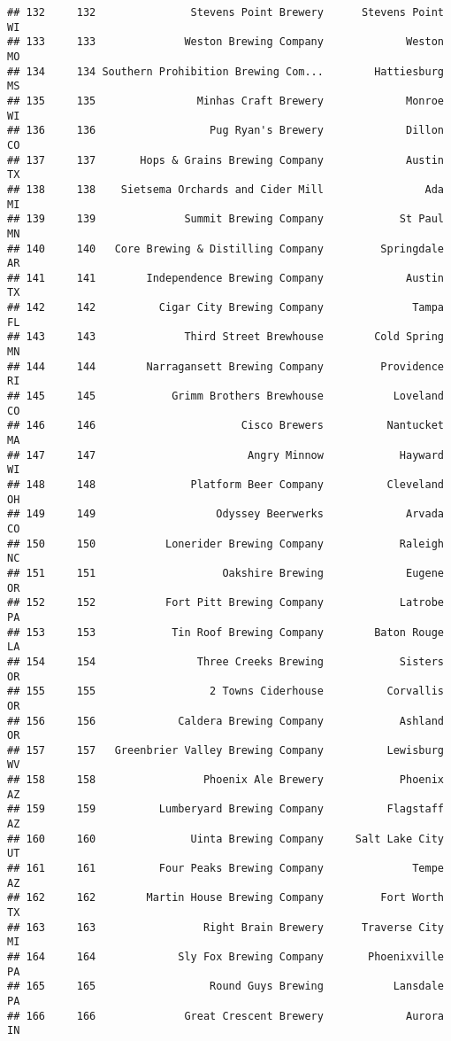 \documentclass[
]{article}
\begin{document}
\begin{verbatim}
## 132     132               Stevens Point Brewery      Stevens Point    WI
## 133     133              Weston Brewing Company             Weston    MO
## 134     134 Southern Prohibition Brewing Com...        Hattiesburg    MS
## 135     135                Minhas Craft Brewery             Monroe    WI
## 136     136                  Pug Ryan's Brewery             Dillon    CO
## 137     137       Hops & Grains Brewing Company             Austin    TX
## 138     138    Sietsema Orchards and Cider Mill                Ada    MI
## 139     139              Summit Brewing Company            St Paul    MN
## 140     140   Core Brewing & Distilling Company         Springdale    AR
## 141     141        Independence Brewing Company             Austin    TX
## 142     142          Cigar City Brewing Company              Tampa    FL
## 143     143              Third Street Brewhouse        Cold Spring    MN
## 144     144        Narragansett Brewing Company         Providence    RI
## 145     145            Grimm Brothers Brewhouse           Loveland    CO
## 146     146                       Cisco Brewers          Nantucket    MA
## 147     147                        Angry Minnow            Hayward    WI
## 148     148               Platform Beer Company          Cleveland    OH
## 149     149                   Odyssey Beerwerks             Arvada    CO
## 150     150           Lonerider Brewing Company            Raleigh    NC
## 151     151                    Oakshire Brewing             Eugene    OR
## 152     152           Fort Pitt Brewing Company            Latrobe    PA
## 153     153            Tin Roof Brewing Company        Baton Rouge    LA
## 154     154                Three Creeks Brewing            Sisters    OR
## 155     155                  2 Towns Ciderhouse          Corvallis    OR
## 156     156             Caldera Brewing Company            Ashland    OR
## 157     157   Greenbrier Valley Brewing Company          Lewisburg    WV
## 158     158                 Phoenix Ale Brewery            Phoenix    AZ
## 159     159          Lumberyard Brewing Company          Flagstaff    AZ
## 160     160               Uinta Brewing Company     Salt Lake City    UT
## 161     161          Four Peaks Brewing Company              Tempe    AZ
## 162     162        Martin House Brewing Company         Fort Worth    TX
## 163     163                 Right Brain Brewery      Traverse City    MI
## 164     164             Sly Fox Brewing Company       Phoenixville    PA
## 165     165                  Round Guys Brewing           Lansdale    PA
## 166     166              Great Crescent Brewery             Aurora    IN

\end{verbatim}
\end{document}
